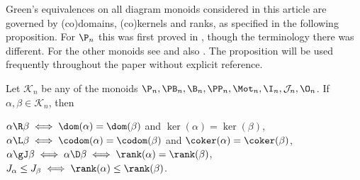 Green's equivalences on all diagram monoids considered in this article are
governed by (co)domains, (co)kernels and ranks, as specified in the following
proposition.  For $\P_n$ this  was first proved in \cite{Wilcox2007}, though
the terminology there was different.  For the other monoids see \cite[Theorem
2.4]{DEG2017} and also \cite{Fernandes2001,FL2011,GMbook,Wilcox2007}.  The
proposition will be used frequently throughout the paper without explicit
reference.


\begin{prop}\label{prop:green_all_inclusive}
Let $\mathcal{K}_n$ be any of the monoids $\P_n,\PB_n,\B_n,\PP_n,\Mot_n,\I_n,\mathcal J_n,\O_n$.  If $\alpha,\beta\in\mathcal K_n$, then
  \begin{itemize}
 $\alpha\R\beta\iff\dom(\alpha)=\dom(\beta)$ and $\ker(\alpha)=\ker(\beta)$,
 $\alpha\L\beta\iff\codom(\alpha)=\codom(\beta)$ and $\coker(\alpha)=\coker(\beta)$,
 $\alpha\gJ\beta\iff\alpha\D\beta\iff\rank(\alpha)=\rank(\beta)$,
 $J_\alpha\leq J_\beta\iff\rank(\alpha)\leq\rank(\beta)$.
\epfres
\end{itemize}
\end{prop}





